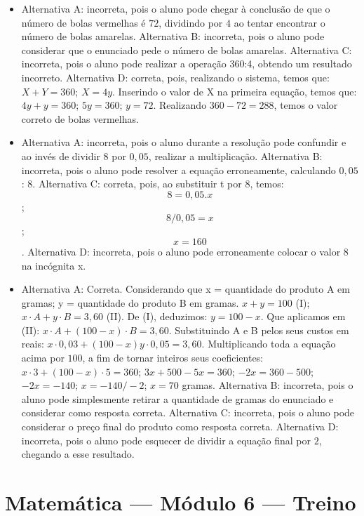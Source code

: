 \begin{itemize}
\item Alternativa A: incorreta, pois o aluno pode chegar à conclusão de que o
número de bolas vermelhas é $72$, dividindo por $4$ ao tentar encontrar o
número de bolas amarelas.
Alternativa B: incorreta, pois o aluno pode considerar que o enunciado
pede o número de bolas amarelas.
Alternativa C: incorreta, pois o aluno pode realizar a operação $360$:4,
obtendo um resultado incorreto.
Alternativa D: correta, pois, realizando o sistema, temos que: $X + Y = 360$; $X = 4y$. Inserindo o valor de X na primeira equação, temos que: $4y + y = 360$; $5y = 360$; $y = 72$. Realizando $360 - 72 = 288$, temos o valor correto de bolas vermelhas.

\item Alternativa A: incorreta, pois o aluno durante a resolução pode
confundir e ao invés de dividir $8$ por $0,05$, realizar a multiplicação.
Alternativa B: incorreta, pois o aluno pode resolver a equação
erroneamente, calculando $0,05$ : $8$.
Alternativa C: correta, pois, ao substituir t por $8$, temos: $$8 = 0,05 . x$$; $$8/0,05 = x$$; $$x = 160$$.
Alternativa D: incorreta, pois o aluno pode erroneamente colocar o valor
8 na incógnita x.

\item Alternativa A: Correta. Considerando que x = quantidade do produto A em gramas; y = quantidade do produto B em gramas. $x + y = 100$ (I); $x·A + y·B = 3,60$ (II). De (I), deduzimos: $y = 100 - x$. Que aplicamos em (II): $x·A + (100-x)·B = 3,60$. Substituindo A e B pelos seus custos em reais: $x·0,03 + (100-x)y·0,05 = 3,60$. Multiplicando toda a equação acima por $100$, a fim de tornar inteiros
seus coeficientes: $x·3 + (100-x)·5 = 360$; $3x + 500 - 5x = 360$; $-2x = 360 - 500$; $-2x = -140$; $x = -140/-2$; $x = 70$ gramas. 
Alternativa B: incorreta, pois o aluno pode simplesmente retirar a
quantidade de gramas do enunciado e considerar como resposta correta.
Alternativa C: incorreta, pois o aluno pode considerar o preço final do
produto como resposta correta.
Alternativa D: incorreta, pois o aluno pode esquecer de dividir a
equação final por $2$, chegando a esse resultado.
\end{itemize}

\section*{Matemática — Módulo 6 — Treino}

